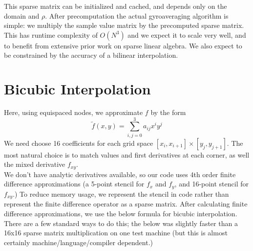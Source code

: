 This sparse matrix can be initialized and cached, and depends only on the domain and $\rho$.  After precomputation the actual gyroaveraging algorithm is simple: we multiply the sample value matrix by the precomputed sparse matrix.  This has runtime complexity of $O(N^3)$ and we expect it to scale very well, and to benefit from extensive prior work on sparse linear algebra.  We also expect to be constrained by the accuracy of a bilinear interpolation.     
 

\section{Bicubic Interpolation\label{sec:Bicubic}}

Here, using equispaced nodes, we approximate $f$ by the form
\[ \tilde{f}(x,y) = \sum_{i,j=0}^{3} a_{ij} x^i y^j \]
We need choose 16 coefficients for each grid space $[x_i,x_{i+1}] \times [y_j, y_{j+1}]$.  The most natural choice is to match values and first derivatives at each corner, as well the mixed derivative $f_{xy}$.  \\
We don't have analytic derivatives available, so our code uses 4th order finite difference approximations (a 5-point stencil for $f_x$ and $f_y$, and 16-point stencil for $f_{xy}$.)  To reduce memory usage, we represent the stencil in code rather than represent the finite difference operator as a sparse matrix.  
After calculating finite difference approximations, we use the below formula for bicubic interpolation.  There are a few standard ways to do this; the below was slightly faster than a 16x16 sparse matrix multiplication on one test machine (but this is almost certainly machine/language/compiler dependent.) 
